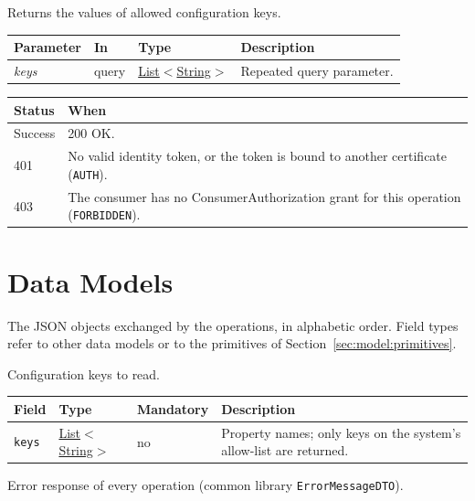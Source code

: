 \documentclass[a4paper]{arrowhead}
\newcommand{\fparam}[1]{\textit{\textcolor{ArrowheadBlue}{#1}}}
\newcommand{\pref}[1]{{\textcolor{ArrowheadGrey}{\hyperref[sec:model:primitives:#1]{#1}}}}
\begin{document}
Returns the values of allowed configuration keys.

{\small
\begin{longtable}{|p{3.0cm}|p{1.4cm}|p{3.2cm}|p{8.2cm}|}

\hline
\rowcolor{gray!33} Parameter & In & Type & Description \\ \hline
\endhead
\fparam{keys} & query & \pref{List}$<$\pref{String}$>$ & Repeated query parameter. \\ \hline
\end{longtable}
}


{\small
\begin{longtable}{|p{2.0cm}|p{13.8cm}|}

\hline
\rowcolor{gray!33} Status & When \\ \hline
\endhead
Success & 200 OK. \\ \hline
401 & No valid identity token, or the token is bound to another certificate (\texttt{AUTH}). \\ \hline
403 & The consumer has no ConsumerAuthorization grant for this operation (\texttt{FORBIDDEN}). \\ \hline
\end{longtable}
}


\newpage
\section{Data Models}
\label{sec:model}
The JSON objects exchanged by the operations, in alphabetic order. Field types refer to other data models or to the
primitives of Section~\ref{sec:model:primitives}.

Configuration keys to read.

{\small
\begin{longtable}{|p{3.7cm}|p{4.2cm}|p{1.6cm}|p{6.3cm}|}

\hline
\rowcolor{gray!33} Field & Type & Mandatory & Description \\ \hline
\endhead
\texttt{keys} & \pref{List}$<$\pref{String}$>$ & no & Property names; only keys on the system's allow-list are returned. \\ \hline
\end{longtable}
}

Error response of every operation (common library \texttt{ErrorMessageDTO}).
\end{document}
